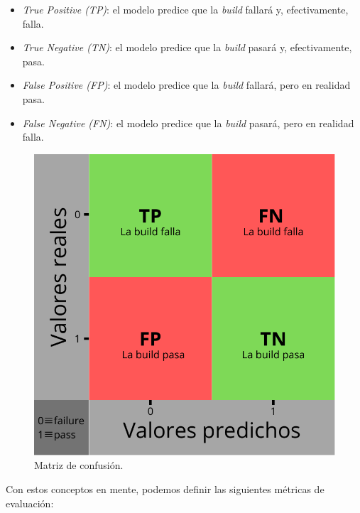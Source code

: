 \begin{itemize}
      \item \textit{True Positive (TP)}: el modelo predice que la \textit{build} fallará y,
            efectivamente, falla.\\
      \item \textit{True Negative (TN)}: el modelo predice que la \textit{build} pasará y,
            efectivamente, pasa.\\
      \item \textit{False Positive (FP)}: el modelo predice que la \textit{build} fallará, pero
            en realidad pasa.\\
      \item \textit{False Negative (FN)}: el modelo predice que la \textit{build} pasará, pero
            en realidad falla.
\end{itemize}


\begin{figure}[H]
      \centering
      \includegraphics[scale=0.50]{images/Confusion matrix.pdf}
      \caption{Matriz de confusión.}
      \label{fig:confusion_matrix}
  \end{figure}

Con estos conceptos en mente, podemos definir las siguientes métricas de evaluación:

